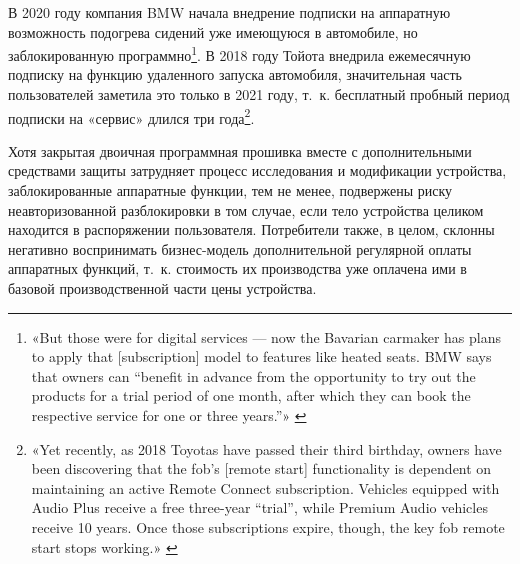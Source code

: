 \documentclass{article}
\begin{document}
В 2020 году компания BMW начала внедрение подписки на аппаратную возможность подогрева сидений уже имеющуюся в автомобиле, но заблокированную программно\footnote{«But those were for digital services — now the Bavarian carmaker has plans to apply that [subscription] model to features like heated seats. BMW says that owners can “benefit in advance from the opportunity to try out the products for a trial period of one month, after which they can book the respective service for one or three years.”» \cite{arstechnicaBmwHardwareSubsription2020}}. В 2018 году Тойота внедрила ежемесячную подписку на функцию удаленного запуска автомобиля, значительная часть пользователей заметила это только в 2021 году, т.~к. бесплатный пробный период подписки на «сервис» длился три года\footnote{«Yet recently, as 2018 Toyotas have passed their third birthday, owners have been discovering that the fob’s [remote start] functionality is dependent on maintaining an active Remote Connect subscription. Vehicles equipped with Audio Plus receive a free three-year “trial”, while Premium Audio vehicles receive 10 years. Once those subscriptions expire, though, the key fob remote start stops working.» \cite{arstechnicaToyotaRemoteConnect2021}}.

Хотя закрытая двоичная программная прошивка вместе с дополнительными средствами защиты затрудняет процесс исследования и модификации устройства, заблокированные аппаратные функции, тем не менее, подвержены риску неавторизованной разблокировки в том случае, если тело устройства целиком находится в распоряжении пользователя. Потребители также, в целом, склонны негативно воспринимать бизнес-модель дополнительной регулярной оплаты аппаратных функций, т.~к. стоимость их производства уже оплачена ими в базовой производственной части цены устройства.
\end{document}
